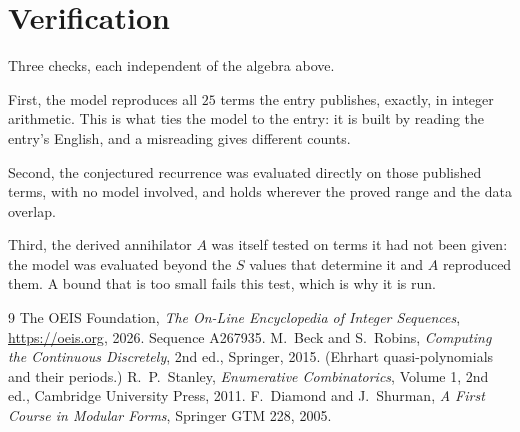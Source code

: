 \documentclass[11pt,a4paper]{article}
\theoremstyle{plain}
\theoremstyle{definition}
\begin{document}
\section{Verification}

Three checks, each independent of the algebra above.

First, the model reproduces all $25$ terms the entry publishes, exactly, in integer
arithmetic. This is what ties the model to the entry: it is built by reading the entry's
English, and a misreading gives different counts.

Second, the conjectured recurrence was evaluated directly on those published terms, with no
model involved, and holds wherever the proved range and the data overlap.

Third, the derived annihilator $A$ was itself tested on terms it had not been given: the model
was evaluated beyond the $S$ values that determine it and $A$ reproduced them. A bound that is
too small fails this test, which is why it is run.

\begin{thebibliography}{9}
 The OEIS Foundation, \emph{The On-Line Encyclopedia of Integer
Sequences}, \url{https://oeis.org}, 2026. Sequence A267935.
 M.~Beck and S.~Robins, \emph{Computing the Continuous Discretely},
2nd ed., Springer, 2015. (Ehrhart quasi-polynomials and their periods.)
 R.~P.~Stanley, \emph{Enumerative Combinatorics}, Volume 1, 2nd ed.,
Cambridge University Press, 2011.
 F.~Diamond and J.~Shurman, \emph{A First Course in Modular Forms},
Springer GTM 228, 2005.
\end{thebibliography}
\end{document}
